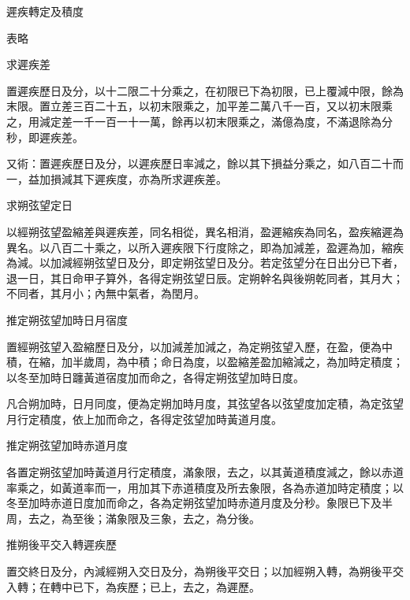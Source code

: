 \begin{pinyinscope}
 遲疾轉定及積度



 表略



 求遲疾差



 置遲疾歷日及分，以十二限二十分乘之，在初限已下為初限，已上覆減中限，餘為末限。置立差三百二十五，以初末限乘之，加平差二萬八千一百，又以初末限乘之，用減定差一千一百一十一萬，餘再以初末限乘之，滿億為度，不滿退除為分秒，即遲疾差。



 又術：置遲疾歷日及分，以遲疾歷日率減之，餘以其下損益分乘之，如八百二十而一，益加損減其下遲疾度，亦為所求遲疾差。



 求朔弦望定日



 以經朔弦望盈縮差與遲疾差，同名相從，異名相消，盈遲縮疾為同名，盈疾縮遲為異名。以八百二十乘之，以所入遲疾限下行度除之，即為加減差，盈遲為加，縮疾為減。以加減經朔弦望日及分，即定朔弦望日及分。若定弦望分在日出分已下者，退一日，其日命甲子算外，各得定朔弦望日辰。定朔幹名與後朔乾同者，其月大；不同者，其月小；內無中氣者，為閏月。



 推定朔弦望加時日月宿度



 置經朔弦望入盈縮歷日及分，以加減差加減之，為定朔弦望入歷，在盈，便為中積，在縮，加半歲周，為中積；命日為度，以盈縮差盈加縮減之，為加時定積度；以冬至加時日躔黃道宿度加而命之，各得定朔弦望加時日度。



 凡合朔加時，日月同度，便為定朔加時月度，其弦望各以弦望度加定積，為定弦望月行定積度，依上加而命之，各得定弦望加時黃道月度。



 推定朔弦望加時赤道月度



 各置定朔弦望加時黃道月行定積度，滿象限，去之，以其黃道積度減之，餘以赤道率乘之，如黃道率而一，用加其下赤道積度及所去象限，各為赤道加時定積度；以冬至加時赤道日度加而命之，各為定朔弦望加時赤道月度及分秒。象限已下及半周，去之，為至後；滿象限及三象，去之，為分後。



 推朔後平交入轉遲疾歷



 置交終日及分，內減經朔入交日及分，為朔後平交日；以加經朔入轉，為朔後平交入轉；在轉中已下，為疾歷；已上，去之，為遲歷。




\end{pinyinscope}
